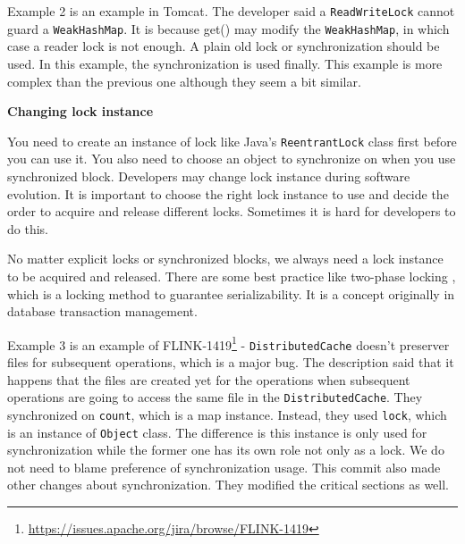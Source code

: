Example 2 is an example in Tomcat. The developer said a \texttt{ReadWriteLock} cannot guard a \texttt{WeakHashMap}. It is because get() may modify the \texttt{WeakHashMap}, in which case a reader lock is not enough. A plain old lock or synchronization should be used. In this example, the synchronization is used finally. This example is more complex than the previous one although they seem a bit similar. %

\textbf{Changing lock instance}

You need to create an instance of lock like Java's \texttt{ReentrantLock} class first before you can use it. You also need to choose an object to synchronize on when you use synchronized block. Developers may change lock instance during software evolution. It is important to choose the right lock instance to use and decide the order to acquire and release different locks. Sometimes it is hard for developers to do this.

No matter explicit locks or synchronized blocks, we always need a lock instance to be acquired and released.  There are some best practice like two-phase locking \cite{journals/cacm/EswarranGLT76}, which is a locking method to guarantee serializability. It is a concept originally in database transaction management. %


Example 3 is an example of FLINK-1419\footnote{\url{https://issues.apache.org/jira/browse/FLINK-1419}} - \texttt{DistributedCache} doesn't preserver files for subsequent operations, which is a major bug. The description said that it happens that the files are created yet for the operations when subsequent operations are going to access the same file in the \texttt{DistributedCache}. They synchronized on \texttt{count}, which is a map instance. Instead, they used \texttt{lock}, which is an instance of \texttt{Object} class. The difference is this instance is only used for synchronization while the former one has its own role not only as a lock. We do not need to blame preference of synchronization usage. This commit also made other changes about synchronization. They modified the critical sections as well.


